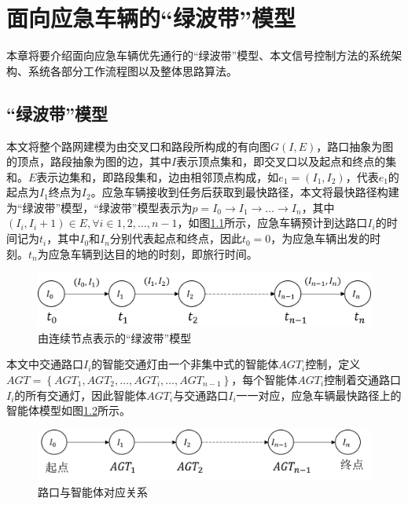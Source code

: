 \chapter{面向应急车辆的“绿波带”模型}
\label{ch3}

本章将要介绍面向应急车辆优先通行的“绿波带”模型、本文信号控制方法的系统架构、系统各部分工作流程图以及整体思路算法。

\section{“绿波带”模型}
本文将整个路网建模为由交叉口和路段所构成的有向图${G(I, E)}$，路口抽象为图的顶点，路段抽象为图的边，其中${I}$表示顶点集和，即交叉口以及起点和终点的集和。${E}$表示边集和，即路段集和，边由相邻顶点构成，如${e_1=(I_1, I_2)}$，代表${e_1}$的起点为${I_1}$终点为${I_2}$。应急车辆接收到任务后获取到最快路径，本文将最快路径构建为“绿波带”模型，“绿波带”模型表示为${p=I_0\rightarrow I_1\rightarrow\ldots\rightarrow I_n}$，其中${(I_i, I_i+1) \in E, \forall i \in 1, 2, \ldots, n-1}$，如图\ref{fig:path}所示，应急车辆预计到达路口${I_i}$的时间记为${t_i}$，其中${I_0}$和${I_n}$分别代表起点和终点，因此${t_0=0}$，为应急车辆出发的时刻。${t_n}$为应急车辆到达目的地的时刻，即旅行时间。


\begin{figure}[H]
	\centering
	\includegraphics[width=\textwidth]{figures/path.png}
	\caption{由连续节点表示的“绿波带”模型}
	\label{fig:path}
\end{figure}

本文中交通路口${I_i}$的智能交通灯由一个非集中式的智能体${AGT_i}$控制，定义${AGT=\left\{ {AGT_1, AGT_2, \ldots , AGT_i, \ldots, AGT_{n-1}} \right\}}$，每个智能体${AGT_i}$控制着交通路口${I_i}$的所有交通灯，因此智能体${AGT_i}$与交通路口${I_i}$一一对应，应急车辆最快路径上的智能体模型如图\ref{fig:agent}所示。

\begin{figure}[H]
	\centering
	\includegraphics[width=\textwidth]{figures/agent.png}
	\caption{路口与智能体对应关系}
	\label{fig:agent}
\end{figure}

